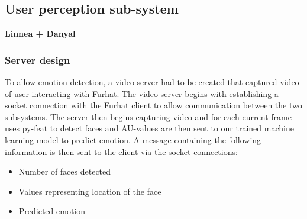 \documentclass[conference]{IEEEtran}
\begin{document}
\subsection{User perception sub-system}
\textbf{Linnea + Danyal}
\subsubsection{Server design}
To allow emotion detection, a video server had to be created that captured video of user interacting with Furhat. The video server begins with establishing a socket connection with the Furhat client to allow communication between the two subsystems. The server then begins capturing video and for each current frame uses py-feat to detect faces and AU-values are then sent to our trained machine learning model to predict emotion. A message containing the following information is then sent to the client via the socket connections:
\begin{itemize}
    \item Number of faces detected
    \item Values representing location of the face
    \item Predicted emotion
\end{itemize}
\end{document}
